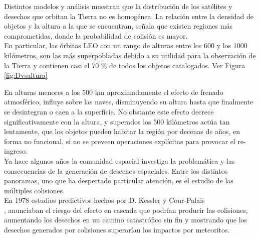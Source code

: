 Distintos modelos y an\'alisis muestran que la distribuci\'on de los sat\'elites y desechos que orbitan la Tierra no es homog\'enea. La relaci\'on entre la densidad de objetos y la altura a la que se encuentran, señala que existen regiones m\'as comprometidas, donde la probabilidad de colisi\'on es mayor.\\

En particular, las \'orbitas LEO con un rango de alturas entre los 600 y los 1000 kil\'ometros, son las m\'as superpobladas debido a su utilidad para la observaci\'on de la Tierra y contienen casi el 70 \% de todos los objetos catalogados. Ver Figura \ref{fig:Dvsaltura}


En alturas menores a los 500 km aproximadamente el efecto de frenado atmosf\'erico, influye sobre las naves, disminuyendo su altura hasta que finalmente se desintegran o caen a la superficie. No obstante este efecto decrece significativamente con la altura, y superados los 500 kil\'ometros act\'ua tan lentamente, que los objetos pueden habitar la regi\'on por decenas de a\~nos, en forma no funcional, si no se preveen operaciones expl\'icitas para provocar el re-ingreso.\\ 

Ya hace algunos a\~nos la comunidad espacial investiga la problem\'atica y las consecuencias de la generaci\'on de desechos espaciales. Entre los distintos panoramas, uno que ha despertado particular atenci\'on, es el estudio de las m\'ultiples colisiones.\\
En 1978  estudios predictivos hechos por D. Kessler y Cour-Palais\\
 \cite{kessler0}, anunciaban el riesgo del efecto en cascada que podr\'ian producir las colisiones, aumentando los desechos en un camino catastr\'ofico sin fin y mostrando que los desechos generados por colisiones superar\'ian los impactos por meteoritos.\\

